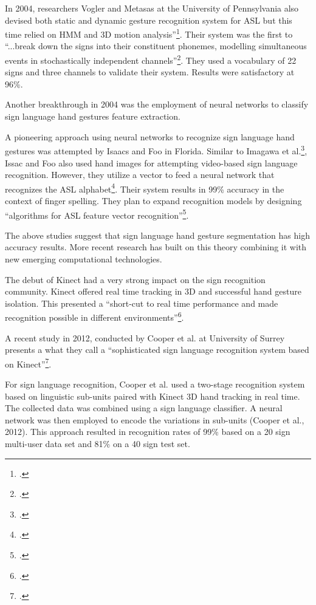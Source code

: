 In 2004, researchers Vogler and Metasas at the University of Pennsylvania also devised both static and dynamic gesture recognition system for ASL but this time relied on HMM and 3D motion analysis''\footcite{Vogler2004}. Their system was the first to ``...break down the signs into their constituent phonemes, modelling simultaneous events in stochastically independent channels''\footcite{Vogler2004}. They used a vocabulary of 22 signs and three channels to validate their system. Results were satisfactory at 96\%.

Another breakthrough in 2004 was the employment of neural networks to classify sign language hand gestures feature extraction. 

A pioneering approach using neural networks to recognize sign language hand gestures was attempted by Isaacs and Foo in Florida. Similar to Imagawa et al.\footcite{Imagawa2000}, Issac and Foo also used hand images for attempting video-based sign language recognition. However, they utilize a vector to feed a neural network that recognizes the ASL alphabet\footcite{Isaacs2004}. Their system results in 99\% accuracy in the context of finger spelling. They plan to expand recognition models by designing ``algorithms for ASL feature vector recognition''\footcite{Isaacs2004}.

The above studies suggest that sign language hand gesture segmentation has high accuracy results. More recent research has built on this theory combining it with new emerging computational technologies. 

The debut of Kinect had a very strong impact on the sign recognition community. Kinect offered real time tracking in 3D and successful hand gesture isolation. This presented a ``short-cut to real time performance and made recognition possible in different environments''\footcite{Cooper2012}.

A recent study in 2012, conducted by Cooper et al. at University of Surrey presents a what they call a ``sophisticated sign language recognition system based on Kinect''\footcite{Cooper2012}.

For sign language recognition, Cooper et al. used a two-stage recognition system based on linguistic sub-units paired with Kinect 3D hand tracking in real time. The collected data was combined using a sign language classifier. A neural network was then employed to encode the variations in sub-units (Cooper et al., 2012). This approach resulted in recognition rates of 99\% based on a 20 sign multi-user data set and 81\% on a 40 sign test set. 

